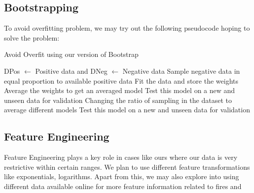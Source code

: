 \documentclass[10pt]{article}
\begin{document}
\subsection{Bootstrapping}
To avoid overfitting problem, we may try out the following pseudocode hoping to
solve the problem:
\begin{algorithm}
    \caption{Avoid Overfit using our version of Bootstrap}
    \begin{algorithmic}[lt]

        \STATE DPos $\gets$ Positive data and DNeg $\gets$ Negative
        data
        \STATE Sample negative data in equal proportion to available positive
        data
        \STATE Fit the data and store the weights
        \ENDFOR
        \STATE Average the weights to get an averaged model
        \STATE Test this model on a new and unseen data for validation
        \REQUIRE Changing the ratio of sampling in the dataset to average
        different models
        \STATE Test this model on a new and unseen data for validation
    \end{algorithmic}
\end{algorithm}

\subsection{Feature Engineering}
Feature Engineering plays a key role in cases like ours where our data is very
restrictive within certain ranges. We plan to use different feature
transformations like exponentials, logarithms. Apart from this, we may also
explore into using different data available online for more feature information
related to fires and
\end{document}
